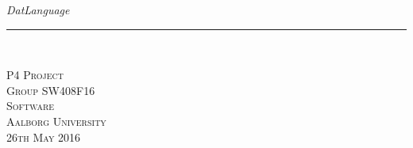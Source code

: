 \thispagestyle{empty}
\begin{flushright}
\vspace{3cm}

\phantom{hul}

\phantom{hul}

\phantom{hul}

\textsl{\Huge DatLanguage} \\ \vspace{1cm}

\rule{13cm}{3mm} \\ \vspace{1.5cm}
\vspace{1cm}



\vspace{7cm} 
\textsc{\Large P4 Project \\
Group SW408F16 \\
Software\\
Aalborg University\\
26th May 2016\\}
\end{flushright}
